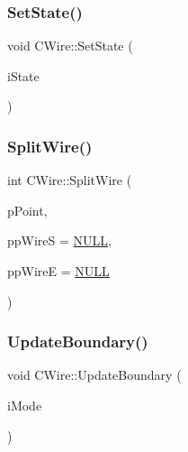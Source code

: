 \mbox{\label{classCWire_aa21e8506c023f4c32481eaccdfeccc2e}} 
\subsubsection{\texorpdfstring{SetState()}{SetState()}}
{\footnotesize\ttfamily void C\+Wire\+::\+Set\+State (\begin{DoxyParamCaption}\item[{int}]{i\+State }\end{DoxyParamCaption})}

\mbox{\label{classCWire_a16b47186198867b019f35eac02b6c52e}} 
\subsubsection{\texorpdfstring{SplitWire()}{SplitWire()}}
{\footnotesize\ttfamily int C\+Wire\+::\+Split\+Wire (\begin{DoxyParamCaption}\item[{\mbox{\hyperlink{classCPoint}{C\+Point}} $\ast$}]{p\+Point,  }\item[{\mbox{\hyperlink{classCWire}{C\+Wire}} $\ast$$\ast$}]{pp\+WireS = {\ttfamily \mbox{\hyperlink{BoxRouter_8h_a070d2ce7b6bb7e5c05602aa8c308d0c4}{N\+U\+LL}}},  }\item[{\mbox{\hyperlink{classCWire}{C\+Wire}} $\ast$$\ast$}]{pp\+WireE = {\ttfamily \mbox{\hyperlink{BoxRouter_8h_a070d2ce7b6bb7e5c05602aa8c308d0c4}{N\+U\+LL}}} }\end{DoxyParamCaption})}

\mbox{\label{classCWire_a2f7cf29379c4f0a57e0c08e321cb25a2}} 
\subsubsection{\texorpdfstring{UpdateBoundary()}{UpdateBoundary()}}
{\footnotesize\ttfamily void C\+Wire\+::\+Update\+Boundary (\begin{DoxyParamCaption}\item[{int}]{i\+Mode }\end{DoxyParamCaption})}



